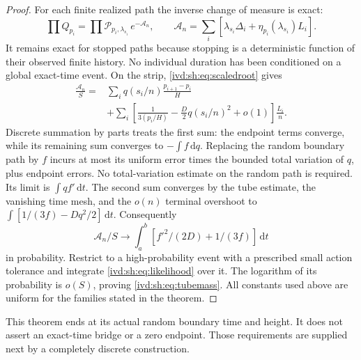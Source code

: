 \documentclass[11pt,letterpaper]{article}
\theoremstyle{remark}\newtheorem{remark}[theorem]{Remark}
\numberwithin{equation}{section}
\newcommand{\dd}{\,\mathrm d}
\newcommand{\asymplaw}{\mathcal P}
\begin{document}
\begin{proof}
For each finite realized path the inverse change of measure is exact:
\begin{equation}\label{ivd:sh:eq:likelihood}
 \prod Q_{p_i}=\prod\asymplaw_{p_i,\lambda_{s_i}}\,e^{-\mathcal A_n},
 \qquad
 \mathcal A_n=\sum_i[\lambda_{s_i}\Delta_i+
                 \eta_{p_i}(\lambda_{s_i})L_i].
\end{equation}
It remains exact for stopped paths because stopping is a deterministic
function of their observed finite history. No individual duration has
been conditioned on a global exact-time event. On the strip,
\eqref{ivd:sh:eq:scaledroot} gives
\begin{align}\label{ivd:sh:eq:likelihoodscaled}
 \frac{\mathcal A_n}{S}
  ={}&\sum_i q(s_i/n)\frac{p_{i+1}-p_i}{H}\\
    &+\sum_i\left[\frac1{3(p_i/H)}-\frac D2q(s_i/n)^2+o(1)\right]
                          \frac{L_i}{n}.\nonumber
\end{align}
Discrete summation by parts treats the first sum: the endpoint terms
converge, while its remaining sum converges to $-\int f\dd q$.
Replacing the random boundary path by $f$ incurs at most its uniform
error times the bounded total variation of $q$, plus endpoint errors.
No total-variation estimate on the random path is required. Its limit
is $\int qf'\dd t$. The second sum converges by the tube estimate,
the vanishing time mesh, and the $o(n)$ terminal overshoot to
$\int[1/(3f)-Dq^2/2]\dd t$. Consequently
\[
 \mathcal A_n/S\longrightarrow
  \int_a^b[f'^2/(2D)+1/(3f)]\dd t
\]
in probability. Restrict to a high-probability event with a prescribed
small action tolerance and integrate \eqref{ivd:sh:eq:likelihood} over it.
The logarithm of its probability is $o(S)$, proving
\eqref{ivd:sh:eq:tubemass}. All constants used above are uniform for the
families stated in the theorem.
\end{proof}
This theorem ends at its actual random boundary time and height.
It does not assert an exact-time bridge or a zero endpoint. Those
requirements are supplied next by a completely discrete construction.
\end{document}
